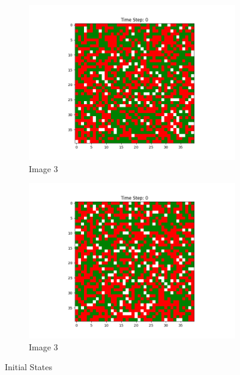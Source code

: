 \documentclass[12pt]{article}
\begin{document}
\begin{figure}[h]
\begin{subfigure}{0.2\textwidth}
			\includegraphics[width=\linewidth]{initial_cluster_w10b20.png}				\caption{Image 3}
		\end{subfigure}\hspace{0.02\textwidth}
		\begin{subfigure}{0.2\textwidth}
			\includegraphics[width=\linewidth]{initial_cluster_w20b20.png}
			\caption{Image 3}
		\end{subfigure}\hspace{0.02\textwidth}
		\caption{Initial States}
	\end{figure}
\end{document}
